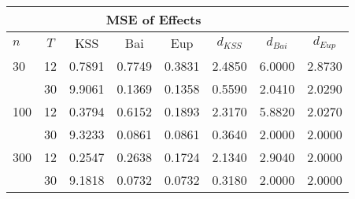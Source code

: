 \begin{tabular}{lccccccc} 
\hline \multicolumn{7}{c}{MSE of Effects} \\ \hline 
$n$ & $T$ & KSS & Bai & Eup & $d_{KSS}$ & $d_{Bai}$ & $d_{Eup}$ \\
\hline
30 & 12 &  0.7891  &  0.7749  &  0.3831  &  2.4850  &  6.0000  &  2.8730  \\
& 30 &  9.9061  &  0.1369  &  0.1358  &  0.5590  &  2.0410  &  2.0290  \\
100 & 12 &  0.3794  &  0.6152  &  0.1893  &  2.3170  &  5.8820  &  2.0270  \\
& 30 &  9.3233  &  0.0861  &  0.0861  &  0.3640  &  2.0000  &  2.0000  \\
300 & 12 &  0.2547  &  0.2638  &  0.1724  &  2.1340  &  2.9040  &  2.0000  \\
& 30 &  9.1818  &  0.0732  &  0.0732  &  0.3180  &  2.0000  &  2.0000  \\
\end{tabular} 
